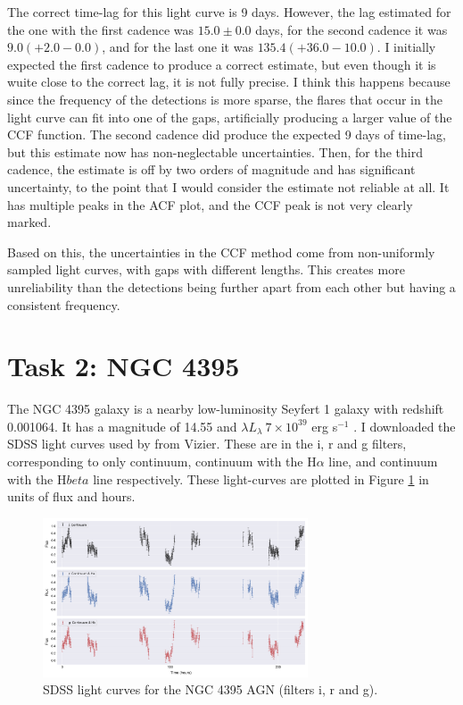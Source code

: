 \documentclass[letterpaper, oneside]{article}
\begin{document}
The correct time-lag for this light curve is 9 days. However, the lag estimated for the one with the first cadence was $15.0 \pm 0.0$ days, for the second cadence it was $9.0 (+ 2.0 - 0.0)$, and for the last one it was $135.4 (+ 36.0 - 10.0)$. I initially expected the first cadence to produce a correct estimate, but even though it is wuite close to the correct lag, it is not fully precise. I think this happens because since the frequency of the detections is more sparse, the flares that occur in the light curve can fit into one of the gaps, artificially producing a larger value of the CCF function. The second cadence did produce the expected 9 days of time-lag, but this estimate now has non-neglectable uncertainties. Then, for the third cadence, the estimate is off by two orders of magnitude and has significant uncertainty, to the point that I would consider the estimate not reliable at all. It has multiple peaks in the ACF plot, and the CCF peak is not very clearly marked.

Based on this, the uncertainties in the CCF method come from non-uniformly sampled light curves, with gaps with different lengths. This creates more unreliability than the detections being further apart from each other but having a consistent frequency.


\section*{Task 2: NGC 4395}

The NGC 4395 galaxy \cite{simbad_ngc4395} is a nearby low-luminosity Seyfert 1 galaxy with redshift 0.001064. It has a magnitude of 14.55 and $\lambda L_{\lambda} ~ 7 \times 10^{39}$ erg s$^{-1}$ \cite{Abazajian_2009, Edri_2012}. I downloaded the SDSS light curves used by \cite{Edri_2012} from Vizier. These are in the i, r and g filters, corresponding to only continuum, continuum with the H$\alpha$ line, and continuum with the H$beta$ line respectively. These light-curves are plotted in Figure \ref{fig:ngc4395_lcs} in units of flux and hours.

\begin{figure}[h]
	\centering
	\includegraphics[width=0.7\textwidth]{../lc_plots/ngc4395_sdss_lcs.pdf}
	\caption{SDSS light curves for the NGC 4395 AGN (filters i, r and g).}
	\label{fig:ngc4395_lcs}
\end{figure}
\end{document}
